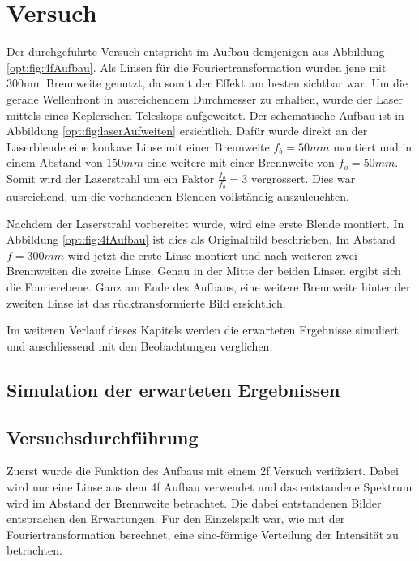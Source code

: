 %
%
%
%
\section{Versuch
  \label{opt:section:versuch}}

Der durchgeführte Versuch entspricht im Aufbau demjenigen aus Abbildung \ref{opt:fig:4fAufbau}.
Als Linsen für die Fouriertransformation wurden jene mit 300mm Brennweite genutzt, da somit der Effekt am besten sichtbar war.
Um die gerade Wellenfront in ausreichendem Durchmesser zu erhalten, wurde der Laser mittels eines Keplerschen Teleskops aufgeweitet.
Der schematische Aufbau ist in Abbildung \ref{opt:fig:laserAufweiten} ersichtlich.
Dafür wurde direkt an der Laserblende eine konkave Linse mit einer Brennweite $f_b = 50mm$ montiert und in einem Abstand von $150mm$ eine weitere mit einer Brennweite von $f_o = 50mm$.
Somit wird der Laserstrahl um ein Faktor $\frac{f_o}{f_b} = 3$ vergrössert.
Dies war ausreichend, um die vorhandenen Blenden vollständig auszuleuchten.

Nachdem der Laserstrahl vorbereitet wurde, wird eine erste Blende montiert.
In Abbildung \ref{opt:fig:4fAufbau} ist dies als Originalbild beschrieben.
Im Abstand $f=300mm$ wird jetzt die erste Linse montiert und nach weiteren zwei Brennweiten die zweite Linse.
Genau in der Mitte der beiden Linsen ergibt sich die Fourierebene.
Ganz am Ende des Aufbaus, eine weitere Brennweite hinter der zweiten Linse ist das rücktransformierte Bild ersichtlich.

Im weiteren Verlauf dieses Kapitels werden die erwarteten Ergebnisse simuliert und anschliessend mit den Beobachtungen verglichen.

\subsection{Simulation der erwarteten Ergebnissen}

\subsection{Versuchsdurchführung}
Zuerst wurde die Funktion des Aufbaus mit einem 2f Versuch verifiziert.
Dabei wird nur eine Linse aus dem 4f Aufbau verwendet und das entstandene Spektrum wird im Abstand der Brennweite betrachtet.
Die dabei entstandenen Bilder entsprachen den Erwartungen.
Für den Einzelspalt war, wie mit der Fouriertransformation berechnet, eine sinc-förmige Verteilung der Intensität zu betrachten.

